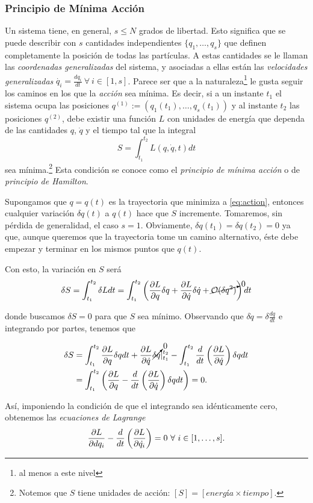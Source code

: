 \subsubsection{Principio de Mínima Acción}
\label{sec:least_action}

Un sistema tiene, en general, $s \leq N$ grados de libertad. Esto significa que se puede describir con $s$ cantidades independientes $\lbrace q_1, \ldots, q_s \rbrace$ que definen completamente la posición de todas las partículas. A estas cantidades se le llaman las \textit{coordenadas generalizadas} del sistema, y asociadas a ellas están las \textit{velocidades generalizadas} $\dot{q_i} = \frac{dq_i}{dt} \  \forall \ i \in [1,s]$. Parece ser que a la naturaleza\footnote{al menos a este nivel} le gusta seguir los caminos en los que la \textit{acción} sea mínima. Es decir, si a un instante $t_1$ el sistema ocupa las posiciones $q^{(1)} := (q_1(t_1), \ldots, q_s(t_1))$ y al instante $t_2$ las posiciones $q^{(2)}$,  debe existir una función $L$ con unidades de energía que dependa de las cantidades $q$, $\dot{q}$ y el tiempo tal que la integral 
\begin{equation}
 S = \int_{t_1}^{t_2} L(q,\dot{q},t) dt
 \label{eq:action}
\end{equation}
sea mínima.\footnote{Notemos que $S$ tiene unidades de acción: $[ S ] = [energía \times tiempo]$.} Esta condición se conoce como el \textit{principio de mínima acción} o de \textit{principio de Hamilton}.

Supongamos que $q = q(t)$ es la trayectoria que minimiza a \ref{eq:action}, entonces cualquier variación $\delta q(t)$ a $q(t)$ hace que $S$ incremente. Tomaremos, sin pérdida de generalidad, el caso $s = 1$. Obviamente, $\delta q(t_1) = \delta q(t_2) = 0$ ya que, aunque queremos que la trayectoria tome un camino alternativo, éste debe empezar y terminar en los mismos puntos que $q(t)$. 

Con esto, la variación en $S$ será 
\begin{align*}
 \delta S = \int_{t_1}^{t_2} \delta L dt = \int_{t_1}^{t_2} \left( \frac{\partial L}{\partial q} \delta q + \frac{\partial L}{\partial  \dot{q} } \delta \dot{q} + \cancelto{0}{\mathcal{O}(\delta q^2)} \right) dt
\end{align*}

donde buscamos $\delta S = 0$ para que $S$ sea mínimo. Observando que $\delta \dot{q} = \delta \frac{dq}{dt}$ e integrando por partes, tenemos que 

\begin{align*}
 \delta S &= \int_{t_1}^{t_2} \frac{\partial L}{\partial q} \delta q dt + \frac{\partial L}{\partial \dot{q}} \cancelto{0}{\delta q} \rvert_{t_1}^{t_2} - \int_{t_1}^{t_2} \frac{d}{dt} \left( \frac{\partial L}{\partial \dot{q}} \right) \delta q dt\\ 
 &= \int_{t_1}^{t_2} \left( \frac{\partial L}{\partial q} - \frac{d}{dt} \left( \frac{\partial L}{\partial  \dot{q} } \right) \delta q dt \right) = 0.
\end{align*}

Así, imponiendo la condición de que el integrando sea idénticamente cero, obtenemos las \textit{ecuaciones de Lagrange}
\begin{equation}
 \frac{\partial L}{\partial d q_i} - \frac{d}{dt} \left( \frac{\partial L}{\partial  \dot{q_i} } \right) = 0 \ \forall \ i \in [1, \ldots, s].
\end{equation}
